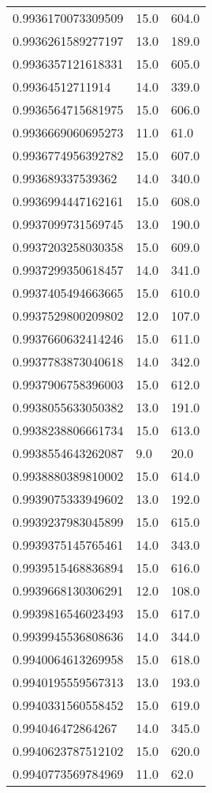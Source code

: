 \begin{center}
\begin{supertabular}[H]{p{0.30\textwidth}p{0.05\textwidth}p{0.05\textwidth}}
0.9936170073309509 & 15.0 & 604.0 \\ 
0.9936261589277197 & 13.0 & 189.0 \\ 
0.9936357121618331 & 15.0 & 605.0 \\ 
0.99364512711914 & 14.0 & 339.0 \\ 
0.9936564715681975 & 15.0 & 606.0 \\ 
0.9936669060695273 & 11.0 & 61.0 \\ 
0.9936774956392782 & 15.0 & 607.0 \\ 
0.993689337539362 & 14.0 & 340.0 \\ 
0.9936994447162161 & 15.0 & 608.0 \\ 
0.9937099731569745 & 13.0 & 190.0 \\ 
0.9937203258030358 & 15.0 & 609.0 \\ 
0.9937299350618457 & 14.0 & 341.0 \\ 
0.9937405494663665 & 15.0 & 610.0 \\ 
0.9937529800209802 & 12.0 & 107.0 \\ 
0.9937660632414246 & 15.0 & 611.0 \\ 
0.9937783873040618 & 14.0 & 342.0 \\ 
0.9937906758396003 & 15.0 & 612.0 \\ 
0.9938055633050382 & 13.0 & 191.0 \\ 
0.9938238806661734 & 15.0 & 613.0 \\ 
0.9938554643262087 & 9.0 & 20.0 \\ 
0.9938880389810002 & 15.0 & 614.0 \\ 
0.9939075333949602 & 13.0 & 192.0 \\ 
0.9939237983045899 & 15.0 & 615.0 \\ 
0.9939375145765461 & 14.0 & 343.0 \\ 
0.9939515468836894 & 15.0 & 616.0 \\ 
0.9939668130306291 & 12.0 & 108.0 \\ 
0.9939816546023493 & 15.0 & 617.0 \\ 
0.9939945536808636 & 14.0 & 344.0 \\ 
0.9940064613269958 & 15.0 & 618.0 \\ 
0.9940195559567313 & 13.0 & 193.0 \\ 
0.9940331560558452 & 15.0 & 619.0 \\ 
0.994046472864267 & 14.0 & 345.0 \\ 
0.9940623787512102 & 15.0 & 620.0 \\ 
0.9940773569784969 & 11.0 & 62.0 \\ 

\end{supertabular}
\end{center}
